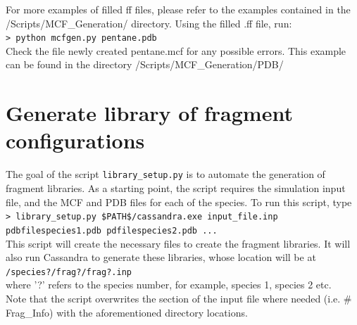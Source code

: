\vspace{3in}
For more examples of filled ff files, please refer to the examples contained in the /Scripts/MCF\_Generation/ directory. Using the
filled .ff file, run: \\

\texttt{> python mcfgen.py pentane.pdb} \\

Check the file newly created pentane.mcf for any possible errors. This example can be found in the directory 
/Scripts/MCF\_Generation/PDB/

\section{Generate library of fragment configurations}
\label{sec:libgen}

The goal of the script \texttt{library\_setup.py} is to automate the generation of fragment libraries.
As a starting point, the script requires the simulation input file, and the MCF and PDB 
files for each of the species. To run this script, type \\

\texttt{> library\_setup.py \$PATH\$/cassandra.exe input\_file.inp pdbfilespecies1.pdb pdfilespecies2.pdb ...} \\

This script will create the necessary files to create the fragment libraries. It will also run Cassandra 
to generate these libraries, whose location will be at \\

\texttt{/species?/frag?/frag?.inp} \\

where '?' refers to the species number, for example, species 1, species 2 etc. \\

Note that the script overwrites the section of the input file where 
needed (i.e. \# Frag\_Info) with the aforementioned directory locations.
